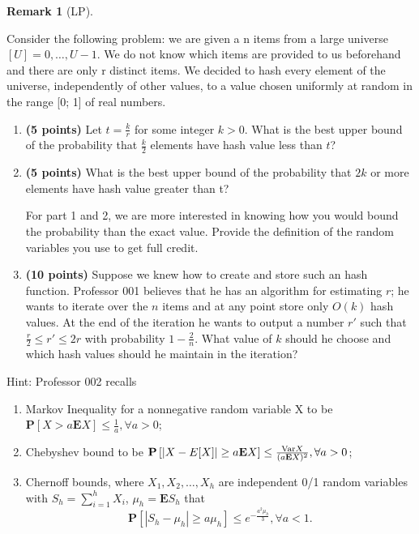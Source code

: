 \documentclass[11pt]{article}
\theoremstyle{numberplain}
\theoremstyle{nonumberplain}
\newtheorem{rem}{Remark}
\newcommand{\0}{{\mathbf{0}}}
\newcommand{\E}{{\mathbf{E}}}
\renewcommand{\P}{{\mathbf{P}}}
\newcommand{\Var}{{\rm Var}}
\begin{document}
\begin{rem}[LP]

\end{rem}


\begin{ques}
Consider the following problem: we are given a n items from a large
universe $[U] = 0,\ldots ,U-1$. We do not know which items are provided to us beforehand and there
are only r distinct items. We decided to hash every element of the universe, independently of other
values, to a value chosen uniformly at random in the range [0; 1] of real numbers.
\begin{enumerate}
\item \textbf{(5 points)} Let $t = \frac{k}{r}$ for some integer $k > 0$. What is the best upper bound of the probability that $\frac{k}{2}$ elements have hash value less than $t$? 
\item \textbf{(5 points)} What is the best upper bound of the probability that $2k$ or more elements have
hash value greater than t? 


For part 1 and 2, we are more interested in knowing how you would bound the
probability than the exact value. Provide the definition of the random variables you use to
get full credit.

\item \textbf{(10 points)} Suppose we knew how to create and store such an hash function. Professor 001
believes that he has an algorithm for estimating $r$; he wants to iterate over the $n$ items and
at any point store only $O(k)$ hash values. At the end of the iteration he wants to output a
number $r'$ such that $\frac{r}{2}\leq r'\leq  2r$ with probability $1-\frac2n$. What value of $k$ should he choose
and which hash values should he maintain in the iteration?
\end{enumerate}
\end{ques}

Hint: Professor 002 recalls
\begin{enumerate}
\item Markov Inequality for a nonnegative random variable X to be $\P\left[X > a\E X\right] \leq \frac1a, \forall a > 0$;
\item Chebyshev bound to be $\P\left[|X -E[X]| \geq a\E X \right] \leq \frac{\Var X}{(a\E X)^2}, \forall a > 0$;
\item Chernoff bounds, where $X_1,X_2,\ldots,X_h$ are independent 0/1 random variables with $S_h =\sum_{i=1}^h X_i$, $\mu_h = \E S_h$ that
$$\P\left[|S_h -\mu_h|\geq a\mu_h \right] \leq e^{-\frac{a^2\mu_h}{3}},\forall a <1.$$
\end{enumerate}
\end{document}
